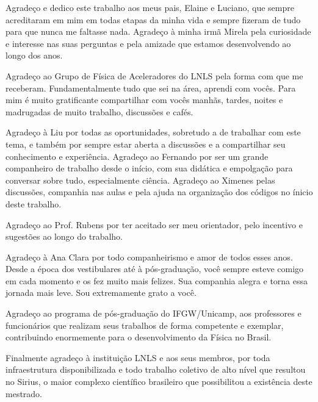 \renewcommand{\sfdefault}{\rmdefault}
\begin{agradecimentos}[Agradecimentos]
    Agradeço e dedico este trabalho aos meus pais, Elaine e Luciano, que sempre acreditaram em mim em todas etapas da minha vida e sempre fizeram de tudo para que nunca me faltasse nada. Agradeço à minha irmã Mirela pela curiosidade e interesse nas suas perguntas e pela amizade que estamos desenvolvendo ao longo dos anos.

    Agradeço ao Grupo de Física de Aceleradores do LNLS pela forma com que me receberam. Fundamentalmente tudo que sei na área, aprendi com vocês. Para mim é muito gratificante compartilhar com vocês manhãs, tardes, noites e madrugadas de muito trabalho, discussões e cafés.
    
    Agradeço à Liu por todas as oportunidades, sobretudo a de trabalhar com este tema, e também por sempre estar aberta a discussões e a compartilhar seu conhecimento e experiência. Agradeço ao Fernando por ser um grande companheiro de trabalho desde o início, com sua didática e empolgação para conversar sobre tudo, especialmente ciência. Agradeço ao Ximenes pelas discussões, companhia nas aulas e pela ajuda na organização dos códigos no ínicio deste trabalho.
    
    Agradeço ao Prof. Rubens por ter aceitado ser meu orientador, pelo incentivo e sugestões ao longo do trabalho.
    
    Agradeço à Ana Clara por todo companheirismo e amor de todos esses anos. Desde a época dos vestibulares até à pós-graduação, você sempre esteve comigo em cada momento e os fez muito mais felizes. Sua companhia alegra e torna essa jornada mais leve. Sou extremamente grato a você. 
    
    
    Agradeço ao programa de pós-graduação do IFGW/Unicamp, aos professores e funcionários que realizam seus trabalhos de forma competente e exemplar, contribuindo enormemente para o desenvolvimento da Física no Brasil.
    
    Finalmente agradeço à instituição LNLS e aos seus membros, por toda infraestrutura disponibilizada e todo trabalho coletivo de alto nível que resultou no Sirius, o maior complexo científico brasileiro que possibilitou a existência deste mestrado.
\end{agradecimentos}

